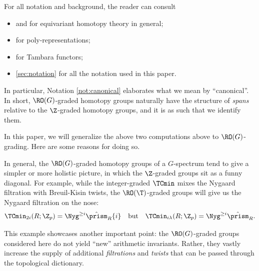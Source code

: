 \begin{remark}
  For all notation and background, the reader can consult
  \begin{itemize}
    \item \cite[Part 1]{SulSliceTHH} and \cite{HillHandbook} for equivariant homotopy theory in general;
    \item \cite[]{SulSlopes} for poly-representations;
    \item \cite[]{PrismsTambara1} for Tambara functors;
    \item \sec\ref{sec:notation} for all the notation used in this paper.
  \end{itemize}
  In particular, Notation \ref{not:canonical} elaborates what we mean by ``canonical''. In short, $\RO(G)$-graded homotopy groups naturally have the structure of \emph{spans} relative to the $\Z$-graded homotopy groups, and it is as such that we identify them.
\end{remark}

In this paper, we will generalize the above two computations above to $\RO(G)$-grading. Here are some reasons for doing so.

\begin{motivation}
  In general, the $\RO(G)$-graded homotopy groups of a $G$-spectrum tend to give a simpler or more holistic picture, in which the $\Z$-graded groups sit as a funny diagonal. For example, while the integer-graded $\TCmin$ mixes the Nygaard filtration with Breuil-Kisin twists, the $\RO(\T)$-graded groups will give us the Nygaard filtration on the nose:
  \[
    \TCmin_{2i}(R;\Z_p) = \Nyg^{\ge i}\hat\prism_R\{i\}
    \quad\text{but}\quad
    \TCmin_{i\lambda}(R;\Z_p) = \Nyg^{\ge i}\hat\prism_R.
  \]

  This example showcases another important point: the $\RO(G)$-graded groups considered here do not yield ``new'' arithmetic invariants. Rather, they vastly increase the supply of additional \emph{filtrations} and \emph{twists} that can be passed through the topological dictionary.
\end{motivation}

